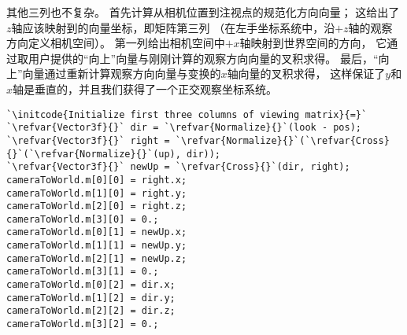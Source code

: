 其他三列也不复杂。
首先计算从相机位置到注视点的规范化方向向量；
这给出了$z$轴应该映射到的向量坐标，即矩阵第三列
（在左手坐标系统中，沿$+z$轴的观察方向定义相机空间）。
第一列给出相机空间中$+x$轴映射到世界空间的方向，
它通过取用户提供的“向上”向量与刚刚计算的观察方向向量的叉积求得。
最后，“向上”向量通过重新计算观察方向向量与变换的$x$轴向量的叉积求得，
这样保证了$y$和$x$轴是垂直的，并且我们获得了一个正交观察坐标系统。
\begin{lstlisting}
`\initcode{Initialize first three columns of viewing matrix}{=}`
`\refvar{Vector3f}{}` dir = `\refvar{Normalize}{}`(look - pos);
`\refvar{Vector3f}{}` right = `\refvar{Normalize}{}`(`\refvar{Cross}{}`(`\refvar{Normalize}{}`(up), dir));
`\refvar{Vector3f}{}` newUp = `\refvar{Cross}{}`(dir, right);
cameraToWorld.m[0][0] = right.x;
cameraToWorld.m[1][0] = right.y;
cameraToWorld.m[2][0] = right.z;
cameraToWorld.m[3][0] = 0.;
cameraToWorld.m[0][1] = newUp.x;
cameraToWorld.m[1][1] = newUp.y;
cameraToWorld.m[2][1] = newUp.z;
cameraToWorld.m[3][1] = 0.;
cameraToWorld.m[0][2] = dir.x;
cameraToWorld.m[1][2] = dir.y;
cameraToWorld.m[2][2] = dir.z;
cameraToWorld.m[3][2] = 0.;
\end{lstlisting}